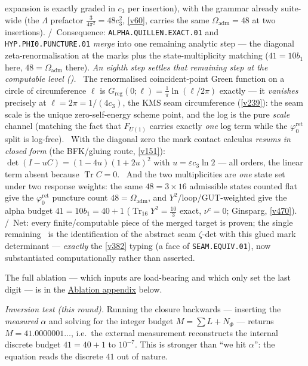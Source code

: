 \documentclass[11pt,a4paper]{article}
\newcommand{\cthree}{c_3}
\newcommand{\phiz}{\varphi_0^{\mathrm{ret}}}
\theoremstyle{definition}
\begin{document}
expansion is exactly graded in $\cthree$ per insertion), with the grammar already suite-wide (the
$\Lambda$ prefactor $\tfrac{3}{4\pi^2}=48\cthree^2$, \vref{v60}, carries the same $\Omega_{\mathrm{adm}}=48$
at two insertions). \mC/\mO\ Consequence: \texttt{ALPHA.QUILLEN.EXACT.01} and \texttt{HYP.PHI0.PUNCTURE.01}
\emph{merge} into one remaining analytic step --- the diagonal zeta-renormalisation at the marks plus the
state-multiplicity matching ($41=10b_1$ here, $48=\Omega_{\mathrm{adm}}$ there).
\emph{An eighth step settles that remaining step at the computable level
().} \mE\ The renormalised coincident-point Green function on a
circle of circumference $\ell$ is $G_{\mathrm{reg}}(0;\ell)=\tfrac1\pi\ln(\ell/2\pi)$ exactly --- it
\emph{vanishes} precisely at $\ell=2\pi=1/(4\cthree)$, the KMS seam circumference (\vref{v239}): the seam
scale is the unique zero-self-energy scheme point, and the log is the pure \emph{scale} channel (matching
the fact that $F_{U(1)}$ carries exactly \emph{one} log term while the $\phiz$ split is log-free). \mE\
With the diagonal zero the mark contact calculus \emph{resums in closed form} (the BFK/gluing route,
\vref{v151}): $\det(I-uC)=(1-4u)(1+2u)^2$ with $u=\varepsilon\cthree\ln2$ --- all orders, the linear term
absent because $\operatorname{Tr}C=0$. \mE\ And the two multiplicities are \emph{one} state set under two
response weights: the same $48=3\times16$ admissible states counted flat give the $\phiz$ puncture count
$48=\Omega_{\mathrm{adm}}$, and $Y^2$/loop/GUT-weighted give the alpha budget $41=10b_1=40+1$
($\operatorname{Tr}_{16}Y^2=\tfrac{10}3$ exact, $\nu^c=0$; Ginsparg, \vref{v470}). \mC/\mO\ Net: every
finite/computable piece of the merged target is proven; the single remaining \mO\ is the identification of
the abstract seam $\zeta$-det with this glued mark determinant --- \emph{exactly} the \vref{v382} typing
(a face of \texttt{SEAM.EQUIV.01}), now substantiated computationally rather than asserted.
\par\smallskip

\noindent The full ablation --- which inputs are load-bearing and which only set the last digit --- is in
the \hyperref[sec:ablation]{Ablation appendix} below.

\emph{Inversion test (this round).} Running the closure backwards --- inserting the \emph{measured}
$\alpha$ and solving for the integer budget $M=\sum L+N_\Phi$ --- returns
$M=41.0000001\ldots$, i.e.\ the external measurement reconstructs the internal discrete budget
$41=40+1$ to $10^{-7}$. This is stronger than ``we hit $\alpha$'': the equation reads the discrete
$41$ out of nature. \mE
\end{document}

